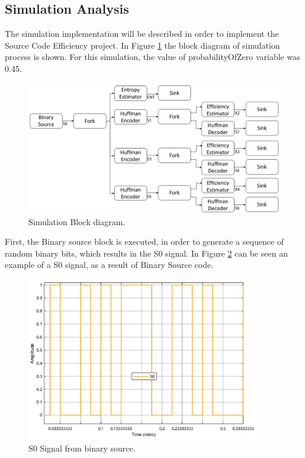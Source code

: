 \begin{refsection}
\subsection{Simulation Analysis}

The simulation implementation will be described in order to implement the Source Code Efficiency project. In Figure \ref{f:simulationdiagram} the block diagram of simulation process is shown.
For this simulation, the value of probabilityOfZero variable was 0.45. 

\begin{figure}[!h]
\centering
\includegraphics[width=6in]{./sdf/eit_45550_estimator_source_code_efficiency/figures/simulationdiagram.png}
\caption[Simulation Block diagram.]{Simulation Block diagram.}
\label{f:simulationdiagram}
\end{figure}

First, the Binary source block is executed, in order to generate a sequence of random binary bits, which results in the S0 signal. In Figure \ref{f:S0} can be seen an example of a S0 signal, as a result of Binary Source code. 


\begin{figure}[!h]
\centering
\includegraphics[width=4in]{./sdf/eit_45550_estimator_source_code_efficiency/figures/S0.png}
\caption[S0 Signal from binary source.]{S0 Signal from binary source.}
\label{f:S0}
\end{figure}


\end{refsection}
